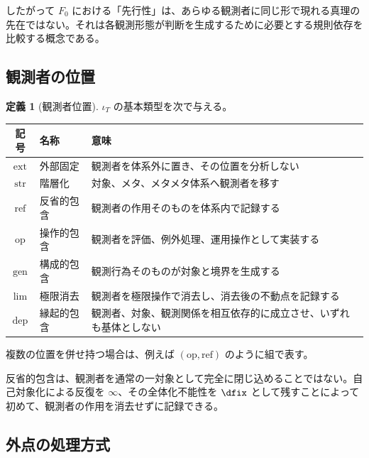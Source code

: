 \documentclass[a4paper,11pt]{ltjsarticle}
\theoremstyle{definition}
\newtheorem{definition}{定義}[section]
\theoremstyle{plain}
\begin{document}
したがって $F_0$ における「先行性」は、あらゆる観測者に同じ形で現れる真理の先在ではない。それは各観測形態が判断を生成するために必要とする規則依存を比較する概念である。

\subsection{観測者の位置}

\begin{definition}[観測者位置]
$\iota_T$ の基本類型を次で与える。
\begin{center}
\begin{tabular}{c l p{}}
\toprule
記号 & 名称 & 意味 \\
\midrule
$\mathrm{ext}$ & 外部固定 & 観測者を体系外に置き、その位置を分析しない \\
$\mathrm{str}$ & 階層化 & 対象、メタ、メタメタ体系へ観測者を移す \\
$\mathrm{ref}$ & 反省的包含 & 観測者の作用そのものを体系内で記録する \\
$\mathrm{op}$ & 操作的包含 & 観測者を評価、例外処理、運用操作として実装する \\
$\mathrm{gen}$ & 構成的包含 & 観測行為そのものが対象と境界を生成する \\
$\mathrm{lim}$ & 極限消去 & 観測者を極限操作で消去し、消去後の不動点を記録する \\
$\mathrm{dep}$ & 縁起的包含 & 観測者、対象、観測関係を相互依存的に成立させ、いずれも基体としない \\
\bottomrule
\end{tabular}
\end{center}
複数の位置を併せ持つ場合は、例えば $(\mathrm{op},\mathrm{ref})$ のように組で表す。
\end{definition}

反省的包含は、観測者を通常の一対象として完全に閉じ込めることではない。自己対象化による反復を $\infty$、その全体化不能性を $\dfix$ として残すことによって初めて、観測者の作用を消去せずに記録できる。

\subsection{外点の処理方式}
\end{document}

